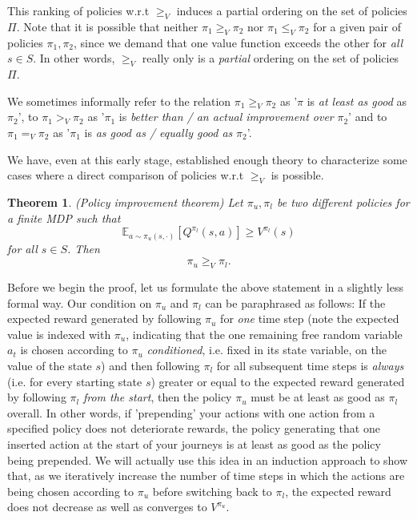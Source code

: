 \documentclass[11pt]{article} %
\newtheorem{thm}{Theorem}
\begin{document}
This ranking of policies w.r.t $\ge_V$ induces a partial ordering on the set of policies $\Pi$. Note that it is possible that neither $\pi_1 \ge_V \pi_2$ nor $\pi_1 \le_V \pi_2$ for a given pair of policies $\pi_1,\pi_2$, since we demand that one value function exceeds the other for \textit{all} $s \in S$. In other words, $\ge_V$ really only is a \textit{partial} ordering on the set of policies $\Pi$.

We sometimes informally refer to the relation $\pi_1 \ge_V \pi_2$ as '$\pi$ is \textit{at least as good} as $\pi_2$', to $\pi_1 >_V \pi_2$ as '$\pi_1$ is \textit{better than / an actual improvement over} $\pi_2$' and to $\pi_1 =_V \pi_2$ as '$\pi_1$ is \textit{as good as / equally good as} $\pi_2$'.

We have, even at this early stage, established enough theory to characterize some cases where a direct comparison of policies w.r.t $\ge_V$ is possible.

\begin{thm}{(Policy improvement theorem)}
	Let $\pi_u, \pi_l$ be two different policies for a finite MDP such that $$ \mathbb{E}_{a \sim \pi_u(s,\cdot )}[Q^{\pi_l}(s,a)] \ge V^{\pi_l}(s)$$ for all $s \in S$. Then $$\pi_u \ge_V \pi_l.$$
\end{thm}

Before we begin the proof, let us formulate the above statement in a slightly less formal way. Our condition on $\pi_u$ and $\pi_l$ can be paraphrased as follows: If the expected reward generated by following $\pi_u$ for \textit{one} time step (note the expected value is indexed with $\pi_u$, indicating that the one remaining free random variable $a_t$ is chosen according to $\pi_u$ \textit{conditioned}, i.e. fixed in its state variable, on the value of the state $s$) and then following $\pi_l$ for all subsequent time steps is \textit{always} (i.e. for every starting state $s$) greater or equal to the expected reward generated by following $\pi_l$ \textit{from the start}, then the policy $\pi_u$ must be at least as good as $\pi_l$ overall. In other words, if 'prepending' your actions with one action from a specified policy does not deteriorate rewards, the policy generating that one inserted action at the start of your journeys is at least as good as the policy being prepended. We will actually use this idea in an induction approach to show that, as we iteratively increase the number of time steps in which the actions are being chosen according to $\pi_u$ before switching back to $\pi_l$, the expected reward does not decrease as well as converges to $V^{\pi_u}$.
\end{document}

